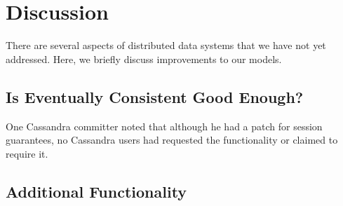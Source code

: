 \documentclass{vldb}
\begin{document}

\section{Discussion}
\label{sec:discussion}

There are several aspects of distributed data systems that we have not yet
addressed.  Here, we briefly discuss improvements to our models.

\subsection{Is Eventually Consistent Good Enough?}

One Cassandra committer noted that although he had a patch for session guarantees, no Cassandra users had requested the functionality or claimed to require it.

\subsection{Additional Functionality}
\end{document}
